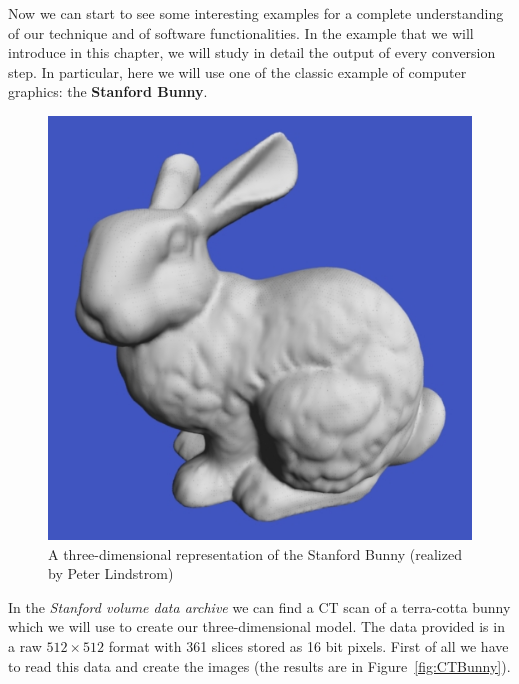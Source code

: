 Now we can start to see some interesting examples for a complete understanding of our technique and of software functionalities. In the example that we will introduce in this chapter, we will study in detail the output of every conversion step. In particular, here we will use one of the classic example of computer graphics: the \textbf{Stanford Bunny}. 
\begin{figure}[htb] %
   \centering
   \includegraphics[width=0.30\linewidth]{images/stanfordBunny.jpg}
   \caption[A three-dimensional representation of the Stanford Bunny]{A three-dimensional representation of the Stanford Bunny (realized by Peter Lindstrom)}
   \label{fig:stanfordBunny}
\end{figure}

In the \textit{Stanford volume data archive} we can find a CT scan of a terra-cotta bunny which we will use to create our three-dimensional model. The data provided is in a raw $512\times512$ format with 361 slices stored as 16 bit pixels. First of all we have to read this data and create the images (the results are in Figure~\ref{fig:CTBunny}).

